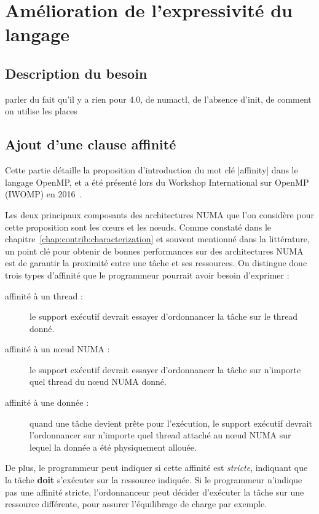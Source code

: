 \section{Amélioration de l'expressivité du langage}\label{sec:openmp:langage}

\subsection{Description du besoin}

parler du fait qu'il y a rien pour 4.0, de numactl, de l'absence d'init, de comment on utilise les places

\subsection{Ajout d'une clause affinité}

Cette partie détaille la proposition d'introduction du mot clé |affinity| dans le langage OpenMP, et a été présenté lors du Workshop International sur OpenMP (IWOMP) en 2016~\cite{Virouleau2016b}.

Les deux principaux composants des architectures NUMA que l'on considère pour cette proposition sont les cœurs et les nœuds.
Comme constaté dans le chapitre~\ref{chap:contrib:characterization} et souvent mentionné dans la littérature, un point clé pour obtenir de bonnes performances sur des architectures NUMA est de garantir la proximité entre une tâche et ses ressources.
On distingue donc trois types d'affinité que le programmeur pourrait avoir besoin d'exprimer :

\begin{description}
    \item [affinité à un thread :]
      le support exécutif devrait essayer d'ordonnancer la tâche sur le thread donné.
    \item [affinité à un nœud NUMA :]
      le support exécutif devrait essayer d'ordonnancer la tâche sur n'importe
      quel thread du nœud NUMA donné.

    \item [affinité à une donnée :]
      quand une tâche devient prête pour l'exécution, le support exécutif devrait
      l'ordonnancer sur n'importe quel thread attaché au nœud NUMA sur lequel
      la donnée a été physiquement allouée.
\end{description}

De plus, le programmeur peut indiquer si cette affinité est \emph{stricte},
indiquant que la tâche \textbf{doit} s'exécuter sur la ressource indiquée.
Si le programmeur n'indique pas une affinité stricte, l'ordonnanceur peut décider
d'exécuter la tâche sur une ressource différente, pour assurer l'équilibrage de
charge par exemple.

